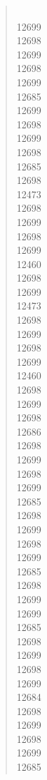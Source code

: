 \documentclass[letterpaper]{article}
\begin{document}
\begin{quote}
{~\\
12699\\
12698\\
12699\\
12698\\
12699\\
12685\\
12699\\
12698\\
12699\\
12698\\
12685\\
12698\\
12473\\
12698\\
12699\\
12698\\
12699\\
12460\\
12698\\
12699\\
12473\\
12698\\
12699\\
12698\\
12699\\
12460\\
12698\\
12699\\
12698\\
12686\\
12698\\
12699\\
12698\\
12699\\
12685\\
12698\\
12699\\
12698\\
12699\\
12685\\
12698\\
12699\\
12699\\
12685\\
12698\\
12699\\
12698\\
12699\\
12684\\
12698\\
12699\\
12698\\
12699\\
12685\\
}
\end{quote}
\end{document}
